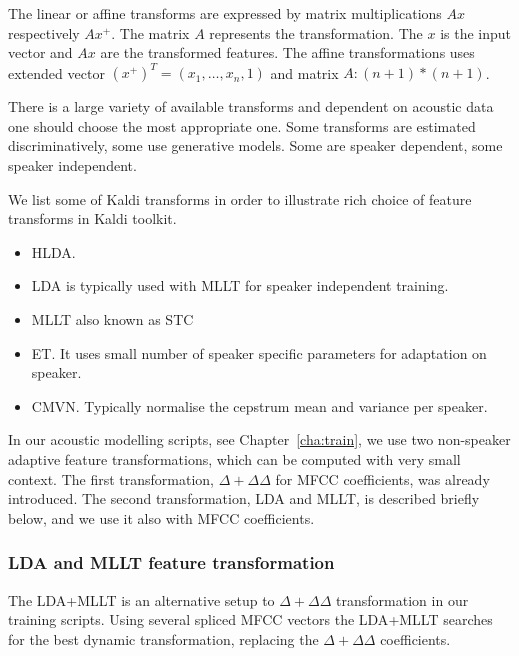 {The linear or affine transforms are expressed by matrix multiplications $Ax$ respectively $Ax^+$.
The matrix $A$ represents the transformation. 
The $x$ is the input vector and $Ax$ are the transformed features.
The affine transformations uses extended vector $(x^+)^T = (x_1, \ldots, x_n, 1)$ and matrix $A: (n+1)*(n+1)$.

There is a large variety of available transforms and dependent on acoustic data one should choose the most appropriate one.
Some transforms are estimated discriminatively, some use generative models.
Some are speaker dependent, some speaker independent.

We list some of Kaldi transforms in order to illustrate rich choice of feature transforms in Kaldi toolkit.
\begin{itemize}
    \item \acf{HLDA}\cite{gales1999semi}.
    \item \acf{LDA}\cite{gopinath1998maximum} is typically used with \acs{MLLT} for speaker independent training.
    \item \acf{MLLT} also known as \acf{STC}\cite{gopinath1998maximum}
    \item \acf{ET}\cite{povey2011exponential}. It uses small number of speaker specific parameters for adaptation on speaker.
    \item \acf{CMVN}\cite{molau2003feature}. Typically normalise the cepstrum mean and variance per speaker.
\end{itemize}

In our acoustic modelling scripts, see Chapter~\ref{cha:train},  we use two non-speaker adaptive feature transformations, which can be computed with very small context. 
The first transformation, $\Delta+\Delta\Delta$  for \ac{MFCC} coefficients, was already introduced.
The second transformation, \ac{LDA} and \ac{MLLT}, is described briefly below, and we use it also with \ac{MFCC} coefficients.

\subsubsection*{\acl{LDA} and \ac{MLLT} feature transformation}
The \ac{LDA}+\ac{MLLT} is an alternative setup to $\Delta+\Delta\Delta$ transformation in our training scripts.
Using several spliced \ac{MFCC} vectors the \ac{LDA}+\ac{MLLT} searches for the best dynamic transformation, replacing the $\Delta+\Delta\Delta$ coefficients.

}
